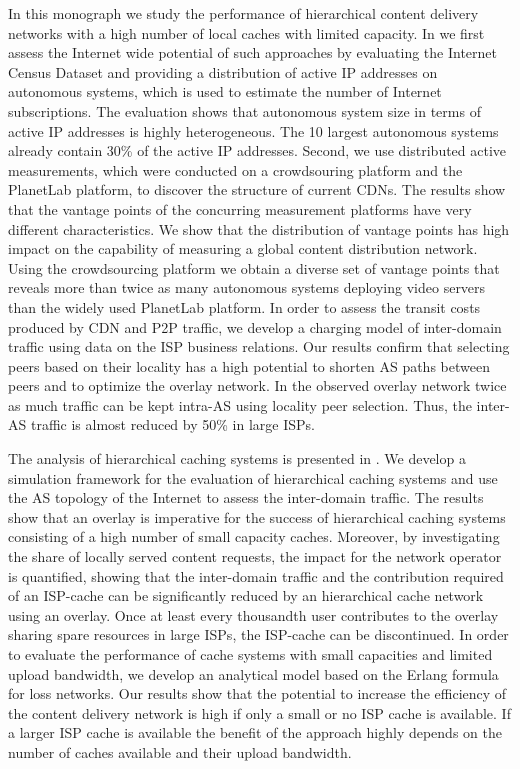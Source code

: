 In this monograph we study the performance of hierarchical content delivery networks with a high number of local caches with limited capacity.
In  we first assess the Internet wide potential of such approaches by evaluating the Internet Census Dataset and providing a distribution of active IP addresses on autonomous systems, which is used to estimate the number of Internet subscriptions.
The evaluation shows that autonomous system size in terms of active IP addresses is highly heterogeneous.
The 10 largest autonomous systems already contain 30\% of the active IP addresses.
Second, we use distributed active measurements, which were conducted on a crowdsouring platform and the PlanetLab platform, to discover the structure of current CDNs.
The results show that the vantage points of the concurring measurement platforms have very different characteristics.
We show that the distribution of vantage points has high impact on the capability of measuring a global content distribution network.
Using the crowdsourcing platform we obtain a diverse set of vantage points that reveals more than twice as many autonomous systems deploying video servers than the widely used PlanetLab platform.
In order to assess the transit costs produced by CDN and P2P traffic, we develop a charging model of inter-domain traffic using data on the ISP business relations.
Our results confirm that selecting peers based on their locality has a high potential to shorten AS paths between peers and to optimize the overlay network. In the observed overlay network twice as much traffic can be kept intra-AS using locality peer selection.
Thus, the inter-AS traffic is almost reduced by 50\% in large ISPs.

The analysis of hierarchical caching systems is presented in .
We develop a simulation framework for the evaluation of hierarchical caching systems and use the AS topology of the Internet to assess the inter-domain traffic.
The results show that an overlay is imperative for the success of hierarchical caching systems consisting of a high number of small capacity caches.
Moreover, by investigating the share of locally served content requests, the impact for the network operator is quantified,
showing that the inter-domain traffic and the contribution required of an ISP-cache can be significantly reduced by an hierarchical cache network using an overlay.
Once at least every thousandth user contributes to the overlay sharing spare resources in large ISPs, the ISP-cache can be discontinued.
In order to evaluate the performance of cache systems with small capacities and limited upload bandwidth, we develop an analytical model based on the Erlang formula for loss networks.
Our results show that the potential to increase the efficiency of the content delivery network is high if only a small or no ISP cache is available.
If a larger ISP cache is available the benefit of the approach highly depends on the number of caches available and their upload bandwidth.

